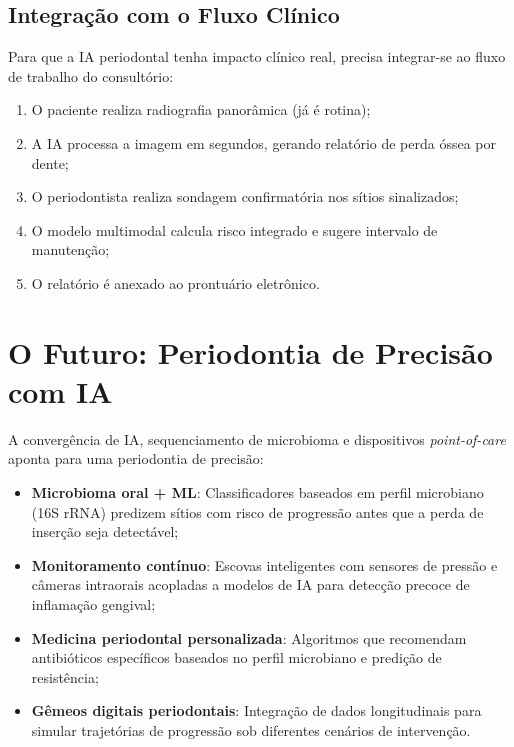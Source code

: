 \subsection{Integração com o Fluxo Clínico}

Para que a IA periodontal tenha impacto clínico real, precisa integrar-se ao fluxo de trabalho do consultório:
\begin{enumerate}
    \item O paciente realiza radiografia panorâmica (já é rotina);
    \item A IA processa a imagem em segundos, gerando relatório de perda óssea por dente;
    \item O periodontista realiza sondagem confirmatória nos sítios sinalizados;
    \item O modelo multimodal calcula risco integrado e sugere intervalo de manutenção;
    \item O relatório é anexado ao prontuário eletrônico.
\end{enumerate}

\section{O Futuro: Periodontia de Precisão com IA}

A convergência de IA, sequenciamento de microbioma e dispositivos \textit{point-of-care} aponta para uma periodontia de precisão:
\begin{itemize}
    \item \textbf{Microbioma oral + ML}: Classificadores baseados em perfil microbiano (16S rRNA) predizem sítios com risco de progressão antes que a perda de inserção seja detectável;
    \item \textbf{Monitoramento contínuo}: Escovas inteligentes com sensores de pressão e câmeras intraorais acopladas a modelos de IA para detecção precoce de inflamação gengival;
    \item \textbf{Medicina periodontal personalizada}: Algoritmos que recomendam antibióticos específicos baseados no perfil microbiano e predição de resistência;
    \item \textbf{Gêmeos digitais periodontais}: Integração de dados longitudinais para simular trajetórias de progressão sob diferentes cenários de intervenção.
\end{itemize}


